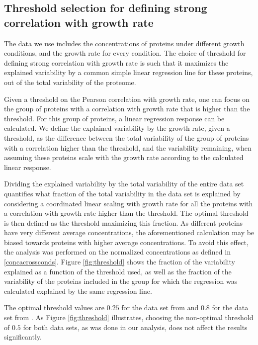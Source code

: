 \subsection{Threshold selection for defining strong correlation with growth rate}
\label{corrthreshold} 
The data we use includes the concentrations of proteins under different growth conditions, and the growth rate for every condition.
The choice of threshold for defining strong correlation with growth rate is such that it maximizes the explained variability by a common simple linear regression line for these proteins, out of the total variability of the proteome.

Given a threshold on the Pearson correlation with growth rate, one can focus on the group of proteins with a correlation with growth rate that is higher than the threshold.
For this group of proteins, a linear regression response can be calculated.
We define the explained variability by the growth rate, given a threshold, as the difference between the total variability of the group of proteins with a correlation higher than the threshold, and the variability remaining, when assuming these proteins scale with the growth rate according to the calculated linear response.

Dividing the explained variability by the total variability of the entire data set quantifies what fraction of the total variability in the data set is explained by considering a coordinated linear scaling with growth rate for all the proteins with a correlation with growth rate higher than the threshold.
The optimal threshold is then defined as the threshold maximizing this fraction.
As different proteins have very different average concentrations, the aforementioned calculation may be biased towards proteins with higher average concentrations.
To avoid this effect, the analysis was performed on the normalized concentrations as defined in \ref{concacrossconds}.
Figure \ref{fig:threshold} shows the fraction of the variability explained as a function of the threshold used, as well as the fraction of the variability of the proteins included in the group for which the regression was calculated explained by the same regression line.

The optimal threshold values are $0.25$ for the data set from \cite{Heinemann2015} and $0.8$ for the data set from \cite{Valgepea2013}.
As Figure \ref{fig:threshold} illustrates, choosing the non-optimal threshold of $0.5$ for both data sets, as was done in our analysis, does not affect the results significantly.